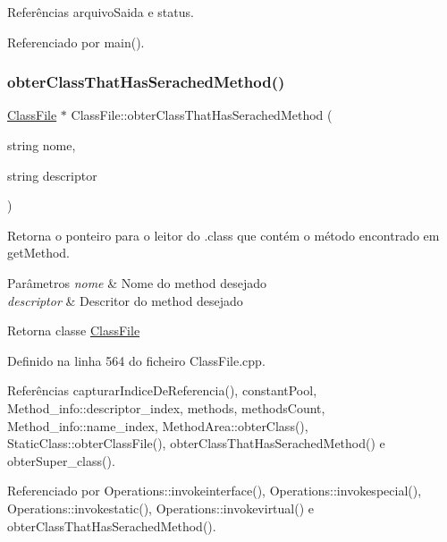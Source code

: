 Referências arquivo\+Saida e status.



Referenciado por main().

\mbox{\label{classClassFile_a4d0ac62c4d6218ddada33f715ebaf633}} 
\subsubsection{\texorpdfstring{obter\+Class\+That\+Has\+Serached\+Method()}{obterClassThatHasSerachedMethod()}}
{\footnotesize\ttfamily \hyperlink{classClassFile}{Class\+File} $\ast$ Class\+File\+::obter\+Class\+That\+Has\+Serached\+Method (\begin{DoxyParamCaption}\item[{string}]{nome,  }\item[{string}]{descriptor }\end{DoxyParamCaption})}



Retorna o ponteiro para o leitor do .class que contém o método encontrado em get\+Method. 


\begin{DoxyParams}{Parâmetros}
{\em nome} & Nome do method desejado \\
\hline
{\em descriptor} & Descritor do method desejado \\
\hline
\end{DoxyParams}
\begin{DoxyReturn}{Retorna}
classe \hyperlink{classClassFile}{Class\+File} 
\end{DoxyReturn}


Definido na linha 564 do ficheiro Class\+File.\+cpp.



Referências capturar\+Indice\+De\+Referencia(), constant\+Pool, Method\+\_\+info\+::descriptor\+\_\+index, methods, methods\+Count, Method\+\_\+info\+::name\+\_\+index, Method\+Area\+::obter\+Class(), Static\+Class\+::obter\+Class\+File(), obter\+Class\+That\+Has\+Serached\+Method() e obter\+Super\+\_\+class().



Referenciado por Operations\+::invokeinterface(), Operations\+::invokespecial(), Operations\+::invokestatic(), Operations\+::invokevirtual() e obter\+Class\+That\+Has\+Serached\+Method().

